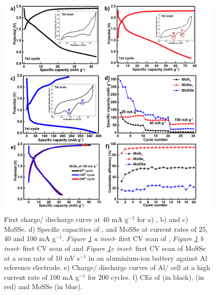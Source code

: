 \begin{figure}[htb!]
\centering
\includegraphics[width=\textwidth]{Figures/chap4fig/MoX2CDCCV}
\caption{First charge/ discharge curve at 40 mA g$^{-1}$ for a) , b)  and c) MoSSe. d) Specific capacities of ,  and MoSSe at current rates of 25, 40 and 100 mA g$^{-1}$. \textit{Figure \ref{Figures/chap4fig:MoX2CDCCV} a inset}- first CV scan of , \textit{Figure \ref{Figures/chap4fig:MoX2CDCCV} b inset}- first CV scan of  and \textit{Figure \ref{Figures/chap4fig:MoX2CDCCV}c inset}- first CV scan of MoSSe at a scan rate of 10 mV s$^{-1}$ in an aluminium-ion battery against Al reference electrode. e) Charge/ discharge curves of Al/ cell at a high current rate of 100 mA g$^{-1}$ for 200 cycles. f) CEs of  (in black),  (in red) and MoSSe (in blue).}
\label{Figures/chap4fig:MoX2CDCCV}
\end{figure} 

